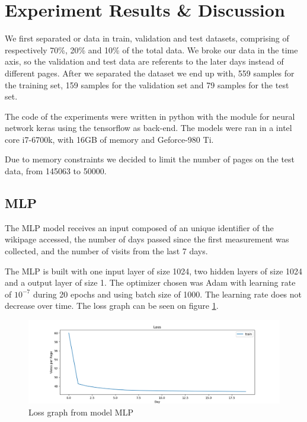 \section{Experiment Results \& Discussion}
\label{sec:experiments}

We first separated or data in train, validation and test datasets,
comprising of respectively 70\%, 20\% and 10\% of the total data.
We broke our data in the time axis, so the validation and test data are referents to the later days instead of different pages.
After we separated the dataset we end up with, 559 samples for the training set, 159 samples for the validation set and 79 samples for the test set.

The code of the experiments were written in python with the module for neural network keras using the tensorflow as back-end.
The models were ran in a intel core i7-6700k, with 16GB of memory and Geforce-980 Ti.

Due to memory constraints we decided to limit the number of pages on the test data, from 145063 to 50000.

\subsection{MLP}

The MLP model receives an input composed of an unique identifier of the wikipage accessed,
the number of days passed since the first measurement was collected,
and the number of visits from the last 7 days.

The MLP is built with one input layer of size 1024, two hidden layers of size 1024 and a output layer of size 1.
The optimizer chosen was Adam with learning rate of $10^{-7}$ during 20 epochs and using batch size of 1000.
The learning rate does not decrease over time. The loss graph can be seen on figure \ref{fig:model_1_loss}.

\begin{figure}
	\centering
	\includegraphics[width=\linewidth]{model_1_loss.png}
	\caption{Loss graph from model MLP\label{fig:model_1_loss}}
\end{figure}

